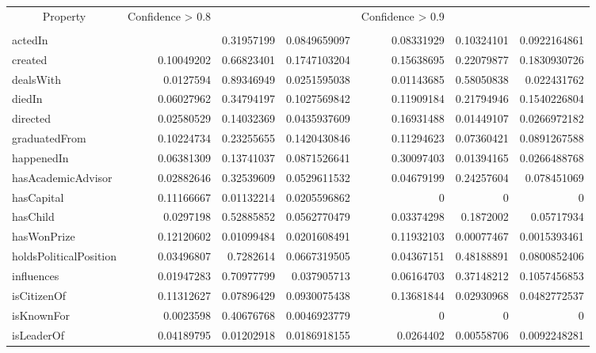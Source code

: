 \begin{table}[htbp]
\centering
\scriptsize
\begin{tabular}{lrrrrrr}
\multicolumn{1}{c}{Property} & \multicolumn{1}{c}{Confidence > 0.8} & \multicolumn{1}{l}{} & \multicolumn{1}{l}{} & \multicolumn{1}{c}{Confidence > 0.9} & \multicolumn{1}{l}{} & \multicolumn{1}{l}{} \\ 
 & \multicolumn{ 1}{l}{} &  \\ 
 actedIn & \multicolumn{ 1}{r}{} & 0.31957199 & 0.0849659097 & 0.08331929 & 0.10324101 & 0.0922164861 \\ 
 created & 0.10049202 & 0.66823401 & 0.1747103204 & 0.15638695 & 0.22079877 & 0.1830930726 \\ 
 dealsWith & 0.0127594 & 0.89346949 & 0.0251595038 & 0.01143685 & 0.58050838 & 0.022431762 \\ 
 diedIn & 0.06027962 & 0.34794197 & 0.1027569842 & 0.11909184 & 0.21794946 & 0.1540226804 \\ 
 directed & 0.02580529 & 0.14032369 & 0.0435937609 & 0.16931488 & 0.01449107 & 0.0266972182 \\ 
 graduatedFrom & 0.10224734 & 0.23255655 & 0.1420430846 & 0.11294623 & 0.07360421 & 0.0891267588 \\ 
 happenedIn & 0.06381309 & 0.13741037 & 0.0871526641 & 0.30097403 & 0.01394165 & 0.0266488768 \\ 
 hasAcademicAdvisor & 0.02882646 & 0.32539609 & 0.0529611532 & 0.04679199 & 0.24257604 & 0.078451069 \\ 
 hasCapital & 0.11166667 & 0.01132214 & 0.0205596862 & 0 & 0 & 0 \\ 
 hasChild & 0.0297198 & 0.52885852 & 0.0562770479 & 0.03374298 & 0.1872002 & 0.05717934 \\ 
 hasWonPrize & 0.12120602 & 0.01099484 & 0.0201608491 & 0.11932103 & 0.00077467 & 0.0015393461 \\ 
 holdsPoliticalPosition & 0.03496807 & 0.7282614 & 0.0667319505 & 0.04367151 & 0.48188891 & 0.0800852406 \\ 
 influences & 0.01947283 & 0.70977799 & 0.037905713 & 0.06164703 & 0.37148212 & 0.1057456853 \\ 
 isCitizenOf & 0.11312627 & 0.07896429 & 0.0930075438 & 0.13681844 & 0.02930968 & 0.0482772537 \\ 
 isKnownFor & 0.0023598 & 0.40676768 & 0.0046923779 & 0 & 0 & 0 \\ 
 isLeaderOf & 0.04189795 & 0.01202918 & 0.0186918155 & 0.0264402 & 0.00558706 & 0.0092248281 \\ 

\end{tabular}
\end{table}
